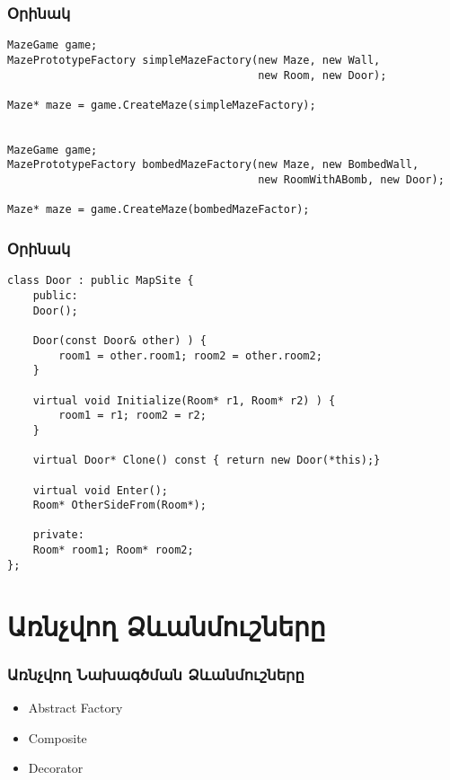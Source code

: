 \documentclass{beamer}
\begin{document}
\begin{frame}[fragile]\frametitle{Օրինակ}
\begin{english}
\begin{verbatim}
MazeGame game;
MazePrototypeFactory simpleMazeFactory(new Maze, new Wall,
                                       new Room, new Door);

Maze* maze = game.CreateMaze(simpleMazeFactory);


MazeGame game;
MazePrototypeFactory bombedMazeFactory(new Maze, new BombedWall,
                                       new RoomWithABomb, new Door);

Maze* maze = game.CreateMaze(bombedMazeFactor);
\end{verbatim}
\end{english}
\end{frame}

\begin{frame}[fragile]\frametitle{Օրինակ}
\begin{english}
\begin{verbatim}
class Door : public MapSite {
    public:
    Door();

    Door(const Door& other) ) {
        room1 = other.room1; room2 = other.room2;
    }

    virtual void Initialize(Room* r1, Room* r2) ) {
        room1 = r1; room2 = r2;
    }

    virtual Door* Clone() const { return new Door(*this);}

    virtual void Enter();
    Room* OtherSideFrom(Room*);

    private:
    Room* room1; Room* room2;
};
\end{verbatim}
\end{english}
\end{frame}

\section{Առնչվող Ձևանմուշները}
\begin{frame}\frametitle{Առնչվող Նախագծման Ձևանմուշները}
\begin{itemize}
    \item Abstract Factory \vfill
    \item Composite \vfill
    \item Decorator
\end{itemize}
\end{frame}
\end{document}

